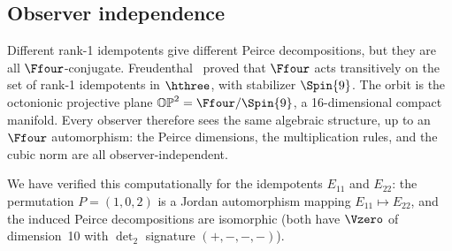 \subsection{Observer independence}

Different rank-1 idempotents give different Peirce decompositions, but
they are all $\Ffour$-conjugate. Freudenthal~\cite{Freudenthal1954}
proved that $\Ffour$ acts transitively on the set of rank-1 idempotents
in $\hthree$, with stabilizer $\Spin{9}$. The orbit is the octonionic
projective plane $\mathbb{OP}^2 = \Ffour/\Spin{9}$, a 16-dimensional
compact manifold. Every observer therefore sees the same algebraic
structure, up to an $\Ffour$ automorphism: the Peirce dimensions, the
multiplication rules, and the cubic norm are all observer-independent.

We have verified this computationally for the idempotents $E_{11}$ and
$E_{22}$: the permutation $P = (1,0,2)$ is a Jordan automorphism
mapping $E_{11} \mapsto E_{22}$, and the induced Peirce decompositions
are isomorphic (both have $\Vzero$ of dimension~10 with
$\det_2$ signature $(+,-,-,-)$).
